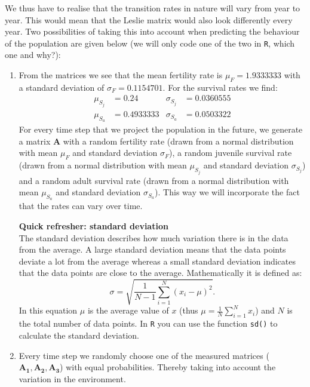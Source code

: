 \documentclass{article}\usepackage[]{graphicx}\usepackage[]{color}
\begin{document}
We thus have to realise that the transition rates in nature will vary from year to year. This would mean that the Leslie matrix would also look differently every year. Two possibilities of taking this into account when predicting the behaviour of the population are given below (we will only code one of the two in \texttt{R}, which one and why?):
\begin{enumerate}
\item From the matrices we see that the mean fertility rate is $\mu_{F} = 1.9333333$ with a standard deviation of $\sigma_{F} = 0.1154701$. For the survival rates we find:
\begin{align*}
\mu_{S_j} &= 0.24 & \sigma_{S_j} &= 0.0360555\\
\mu_{S_a} &= 0.4933333 & \sigma_{S_a} &= 0.0503322
\end{align*}
For every time step that we project the population in the future, we generate a matrix $\boldsymbol{A}$ with a random fertility rate (drawn from a normal distribution with mean $\mu_F$ and standard deviation $\sigma_F$), a random juvenile survival rate (drawn from a normal distribution with mean $\mu_{S_j}$ and standard deviation $\sigma_{S_j}$) and a random adult survival rate (drawn from a normal distribution with mean $\mu_{S_a}$ and standard deviation $\sigma_{S_a}$). This way we will incorporate the fact that the rates can vary over time.
\begin{mdframed}
\textbf{Quick refresher: standard deviation}\\
The standard deviation describes how much variation there is in the data from the average. A large standard deviation means that the data points deviate a lot from the average whereas a small standard deviation indicates that the data points are close to the average. Mathematically it is defined as:
\begin{equation*}
\sigma = \sqrt{\frac{1}{N-1}\sum_{i=1}^{N}{(x_i-\mu)^2}}.
\end{equation*}
In this equation $\mu$ is the average value of $x$ (thus $\mu=\frac{1}{N}\sum_{i=1}^{N}{x_i}$) and $N$ is the total number of data points. In \texttt{R} you can use the function \texttt{sd()} to calculate the standard deviation.
\end{mdframed}
\item Every time step we randomly choose one of the measured matrices ($\boldsymbol{A_1,A_2,A_3}$) with equal probabilities. Thereby taking into account the variation in the environment.
\end{enumerate}
\end{document}
